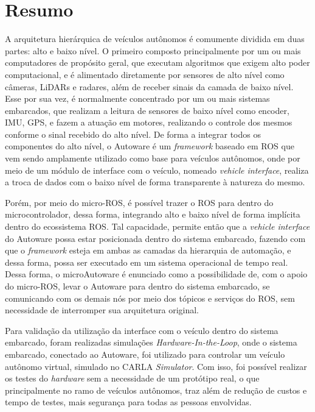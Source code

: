 \section{Resumo}

A arquitetura hierárquica de veículos autônomos é comumente dividida em duas partes: alto e baixo nível. O primeiro composto principalmente por um ou mais computadores de propósito geral, que executam algoritmos que exigem alto poder computacional, e é alimentado diretamente por sensores de alto nível como câmeras, LiDARs e radares, além de receber sinais da camada de baixo nível. Esse por sua vez, é normalmente concentrado por um ou mais sistemas embarcados, que realizam a leitura de sensores de baixo nível como encoder, IMU, GPS, e fazem a atuação em motores, realizando o controle dos mesmos conforme o sinal recebido do alto nível. De forma a integrar todos os componentes do alto nível, o Autoware é um \textit{framework} baseado em ROS que vem sendo amplamente utilizado como base para veículos autônomos, onde por meio de um módulo de interface com o veículo, nomeado \textit{vehicle interface}, realiza a troca de dados com o baixo nível de forma transparente à natureza do mesmo. 

Porém, por meio do micro-ROS, é possível trazer o ROS para dentro do microcontrolador, dessa forma, integrando alto e baixo nível de forma implícita dentro do ecossistema ROS. Tal capacidade, permite então que a \textit{vehicle interface} do Autoware possa estar posicionada dentro do sistema embarcado, fazendo com que o \textit{framework} esteja em ambas as camadas da hierarquia de automação, e dessa forma, possa ser executado em um sistema operacional de tempo real. Dessa forma, o microAutoware é enunciado como a possibilidade de, com o apoio do micro-ROS, levar o Autoware para dentro do sistema embarcado, se comunicando com os demais nós por meio dos tópicos e serviços do ROS, sem necessidade de interromper sua arquitetura original.

Para validação da utilização da interface com o veículo dentro do sistema embarcado, foram realizadas simulações \textit{Hardware-In-the-Loop}, onde o sistema embarcado, conectado ao Autoware, foi utilizado para controlar um veículo autônomo virtual, simulado no CARLA \textit{Simulator}. Com isso, foi possível realizar os testes do \textit{hardware} sem a necessidade de um protótipo real, o que principalmente no ramo de veículos autônomos, traz além de redução de custos e tempo de testes, mais segurança para todas as pessoas envolvidas.

